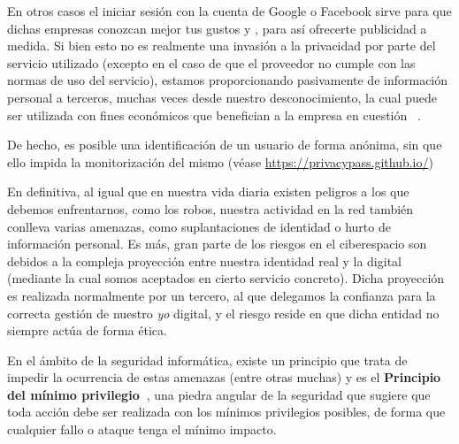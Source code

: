 En otros casos el iniciar sesión con la cuenta de Google o Facebook
sirve para que dichas empresas conozcan mejor tus gustos y
 ,
para así ofrecerte publicidad a medida. Si bien esto no es realmente una invasión a la privacidad por parte del servicio utilizado (excepto en el caso de que el proveedor no cumple con las normas de uso del servicio), estamos proporcionando pasivamente de información personal a terceros, muchas veces desde nuestro desconocimiento, la cual puede ser utilizada con fines económicos que benefician a la empresa en cuestión ~\cite{article:compraventa}. 

De hecho, es posible una identificación de un usuario de forma anónima, sin que ello impida la monitorización del mismo (véase \url{https://privacypass.github.io/})


En definitiva, al igual que en nuestra vida diaria existen peligros a los que debemos enfrentarnos, como los robos, nuestra actividad en la red también conlleva varias amenazas, como suplantaciones de identidad o hurto de información personal. Es más, gran parte de los riesgos en el ciberespacio son debidos a la compleja proyección entre nuestra identidad real y la digital (mediante la cual somos aceptados en cierto servicio concreto). Dicha proyección es realizada  normalmente por un tercero, al que delegamos la confianza para la correcta gestión de nuestro \textit{yo} digital, y el riesgo reside en que dicha entidad no siempre actúa de forma ética.

En el ámbito de la seguridad informática, existe un principio que trata de impedir la ocurrencia de estas amenazas (entre otras muchas) y es el \textbf{Principio del mínimo privilegio~\cite{schneider2003least}}, una piedra angular de la seguridad que sugiere que toda acción debe ser realizada con los mínimos privilegios posibles, de forma que cualquier fallo o ataque tenga el mínimo impacto. 

